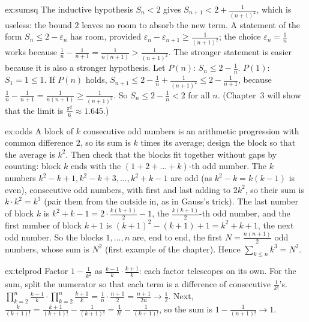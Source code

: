 \begin{solution}{ex:sumsq}
\idea The inductive hypothesis $S_n<2$ gives $S_{n+1}<2+\frac1{(n+1)^2}$, which is useless: the bound $2$ leaves no room to absorb the new term. A statement of the form $S_n\le2-\varepsilon_n$ has room, provided $\varepsilon_n-\varepsilon_{n+1}\ge\frac1{(n+1)^2}$; the choice $\varepsilon_n=\frac1n$ works because $\frac1n-\frac1{n+1}=\frac1{n(n+1)}>\frac1{(n+1)^2}$. The stronger statement is easier because it is also a stronger hypothesis.
\writeup Let $P(n)$: $S_n\le2-\frac1n$. $P(1)$: $S_1=1\le1$. If $P(n)$ holds, $S_{n+1}\le2-\frac1n+\frac1{(n+1)^2}\le2-\frac1{n+1}$, because
$\frac1n-\frac1{n+1}=\frac1{n(n+1)}\ge\frac1{(n+1)^2}$. So $S_n\le2-\frac1n<2$ for all $n$. (Chapter~3 will show that the limit is $\frac{\pi^2}6\approx1.645$.)
\end{solution}

\begin{solution}{ex:odds}
\idea A block of $k$ consecutive odd numbers is an arithmetic progression with common difference $2$, so its sum is $k$ times its average; design the block so that the average is $k^2$. Then check that the blocks fit together without gaps by counting: block $k$ ends with the $(1+2+\dots+k)$-th odd number.
\writeup The $k$ numbers $k^2-k+1,k^2-k+3,\dots,k^2+k-1$ are odd (as $k^2-k=k(k-1)$ is even), consecutive odd numbers, with first and last adding to $2k^2$, so their sum is $k\cdot k^2=k^3$ (pair them from the outside in, as in Gauss's trick). The last number of block $k$ is $k^2+k-1=2\cdot\frac{k(k+1)}2-1$, the $\frac{k(k+1)}2$-th odd number, and the first number of block $k+1$ is $(k+1)^2-(k+1)+1=k^2+k+1$, the next odd number. So the blocks $1,\dots,n$ are, end to end, the first $N=\frac{n(n+1)}2$ odd numbers, whose sum is $N^2$ (first example of the chapter). Hence $\sum_{k\le n}k^3=N^2$.
\end{solution}

\begin{solution}{ex:telprod}
\idea Factor $1-\frac1{k^2}$ as $\frac{k-1}k\cdot\frac{k+1}k$: each factor telescopes on its own. For the sum, split the numerator so that each term is a difference of consecutive $\frac1{k!}$'s.
\writeup $\prod_{k=2}^n\frac{k-1}k\cdot\prod_{k=2}^n\frac{k+1}k=\frac1n\cdot\frac{n+1}2=\frac{n+1}{2n}\to\frac12$.
Next, $\frac k{(k+1)!}=\frac{k+1}{(k+1)!}-\frac1{(k+1)!}=\frac1{k!}-\frac1{(k+1)!}$, so the sum is $1-\frac1{(n+1)!}\to1$.
\end{solution}

